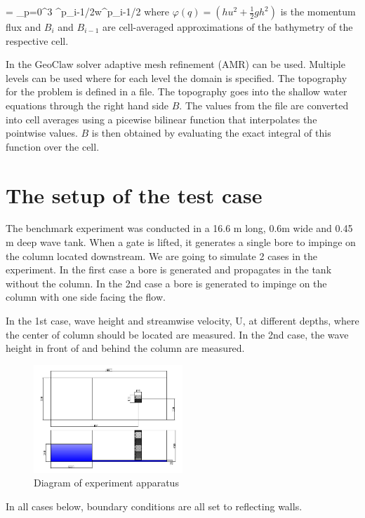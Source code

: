\documentclass[11pt]{article}
\begin{document}
= \sum_{p=0}^3 \alpha^p_{i-1/2}w^p_{i-1/2}
\en
where $\varphi (q) = (hu^2 +\frac{1}{2}gh^2)$ is the momentum flux and $B_i$ and $B_{i-1}$ are cell-averaged approximations of the bathymetry of the respective cell.
\par
In the GeoClaw solver adaptive mesh refinement (AMR) can be used. Multiple levels can be used where for each level the domain is specified. The topography for the problem is defined in a file. The topography goes into the shallow water equations through the right hand side $B$. The values from the file are converted into cell averages using a picewise bilinear function that interpolates the pointwise values. $B$ is then obtained by evaluating the exact integral of this function over the cell. 
\section{The setup of the test case}\label{Sec:Setup}
The benchmark experiment was conducted in a 16.6 m long, 0.6m wide and 0.45 m deep wave tank. When a gate is lifted, it generates a single bore to impinge on the column located downstream.
We are going to simulate 2 cases in the experiment. In the first case a bore is generated and propagates in the tank without the column. In the 2nd case a bore is generated to impinge on the column with one side facing the flow.
\par
In the 1st case, wave height and streamwise velocity, U, at different depths, where the center of column should be located are measured. In the 2nd case, the wave height in front of and behind the column are measured.
        \begin{figure}[h!]
            \centering
            \includegraphics[width=0.5\textwidth]{../proposal/figures/Diagram_case}
            \caption{Diagram of experiment apparatus}
        \end{figure}

In all cases below, boundary conditions are all set to reflecting walls. 
\end{document}
